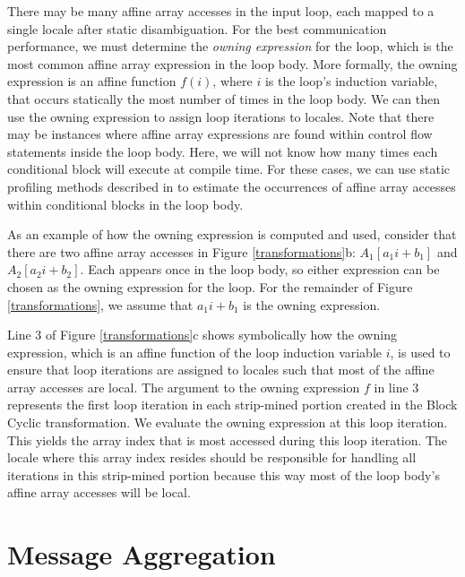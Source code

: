 There may be many affine array accesses in the input loop, each mapped to a single locale after static disambiguation. For the best communication performance, we must determine the \textit{owning expression} for the loop, which is the most common affine array expression in the loop body. More formally, the owning expression is an affine function $f(i)$, where $i$ is the loop's induction variable, that occurs statically the most number of times in the loop body. We can then use the owning expression to assign loop iterations to locales. Note that there may be instances where affine array expressions are found within control flow statements inside the loop body. Here, we will not know how many times each conditional block will execute at compile time. For these cases, we can use static profiling methods described in \cite{wu1994static} to estimate the occurrences of affine array accesses within conditional blocks in the loop body. 

As an example of how the owning expression is computed and used, consider that there are two affine array accesses in Figure \ref{transformations}b: $A_{1}[a_{1}i+b_{1}]$ and $A_{2}[a_{2}i+b_{2}]$. Each appears once in the loop body, so either expression can be chosen as the owning expression for the loop. For the remainder of Figure \ref{transformations}, we assume that $a_{1}i+b_{1}$ is the owning expression. 

Line 3 of Figure \ref{transformations}c shows symbolically how the owning expression, which is an affine function of the loop induction variable $i$, is used to ensure that loop iterations are assigned to locales such that most of the affine array accesses are local. The argument to the owning expression $f$ in line 3 represents the first loop iteration in each strip-mined portion created in the Block Cyclic transformation. We evaluate the owning expression at this loop iteration. This yields the array index that is most accessed during this loop iteration. The locale where this array index resides should be responsible for handling all iterations in this strip-mined portion because this way most of the loop body's affine array accesses will be local.

\section{Message Aggregation}\label{sec:message_aggregation}

